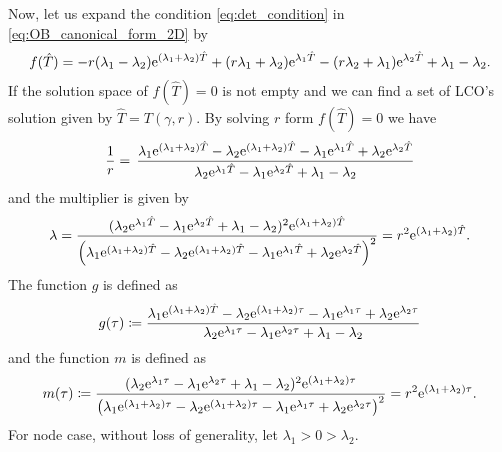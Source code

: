 \documentclass{article}
\begin{document}
Now, let us expand the  condition \cref{eq:det_condition} in \cref{eq:OB_canonical_form_2D} by 
\[
f(\hat{T}) = -r (\lambda_1 - \lambda_2){\rm e}^{(\lambda_1 + \lambda_2) \hat{T} } + (r \lambda_1 + \lambda_2){\rm e }^{  \lambda_1 \hat{T} } - (r \lambda_2 + \lambda_1) {\rm e}^{\lambda_2 \hat{T}} + \lambda_1 - \lambda_2.
\]
If the solution space of $f(\hat{T}) =0 $ is not empty and we can find a set of LCO's solution given by 
$\hat{T} = T(\gamma, r)$.
By solving $r$ form $f(\hat{T}) =0$  we have 
\begin{equation}
	\frac{1}{r} = \, \frac{ \lambda_1 {\rm e}^{(\lambda_1 + \lambda_2) \hat{T}} - \lambda_2 {\rm e}^{(\lambda_1 + \lambda_2) \hat{T}} - \lambda_1 {\rm e}^{\lambda_1 \hat{T}}  +  \lambda_2 {\rm e}^{\lambda_2 \hat{T}}   }
	{\lambda_2 {\rm e}^{\lambda_1 \hat{T}} - \lambda_1 {\rm e}^{\lambda_2 \hat{T}} + \lambda_1 - \lambda_2 }
	\label{eq:r_value_cond_sn}
\end{equation}
and the multiplier is given by 
\begin{equation}
	\lambda =  \frac{(\lambda_2 {\rm e}^{\lambda_1 \hat{T}} - \lambda_1 {\rm e}^{\lambda_2 \hat{T}} + \lambda_1 - \lambda_2)^2 {\rm e}^{(\lambda_1 + \lambda_2) \hat{T}} }
	{\left(\lambda_1 {\rm e}^{(\lambda_1 + \lambda_2) \hat{T}} - \lambda_2 {\rm e}^{(\lambda_1 + \lambda_2) \hat{T}} - \lambda_1 {\rm e}^{\lambda_1 \hat{T}}  +  \lambda_2 {\rm e}^{\lambda_2 \hat{T}}\right)^2} = r^2 {\rm e}^{(\lambda_1 + \lambda_2) \hat{T}}.
\end{equation}
The function $g$ is defined as
\begin{equation}
	\label{eq:def_of_r_sn}
	g(\tau) \coloneq \frac{ \lambda_1 {\rm e}^{(\lambda_1 + \lambda_2) \hat{T}} - \lambda_2 {\rm e}^{(\lambda_1 + \lambda_2) \tau} - \lambda_1 {\rm e}^{\lambda_1 \tau}  +  \lambda_2 {\rm e}^{\lambda_2 \tau}   }
	{\lambda_2 {\rm e}^{\lambda_1 \tau} - \lambda_1 {\rm e}^{\lambda_2 \tau} + \lambda_1 - \lambda_2 }
\end{equation}
and the function $m$ is defined as 
\begin{equation}
	\label{eq:def_of_mp_sn}
	m(\tau) \coloneq \frac{(\lambda_2 {\rm e}^{\lambda_1 \tau} - \lambda_1 {\rm e}^{\lambda_2 \tau} + \lambda_1 - \lambda_2)^2 {\rm e}^{(\lambda_1 + \lambda_2) \tau} }
	{\left(\lambda_1 {\rm e}^{(\lambda_1 + \lambda_2) \tau} - \lambda_2 {\rm e}^{(\lambda_1 + \lambda_2) \tau} - \lambda_1 {\rm e}^{\lambda_1 \tau}  +  \lambda_2 {\rm e}^{\lambda_2 \tau}\right)^2} = r^2 {\rm e}^{(\lambda_1 + \lambda_2) \tau}.
\end{equation}
For node case, without loss of generality, let $\lambda_1 > 0 > \lambda_2$.
\end{document}
